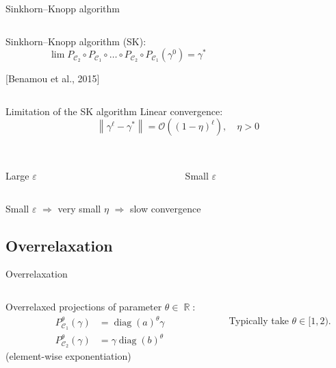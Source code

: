 \documentclass[compress]{beamer}
\DeclareMathOperator{\IR}{\mathbb{R}}
\DeclareMathOperator{\Ccal}{\mathcal{C}}
\DeclareMathOperator{\diag}{diag}
\newcommand{\norm}[1]{\left\lVert #1 \right\rVert}
\renewcommand{\epsilon}{\varepsilon}
\begin{document}
\begin{frame}{Sinkhorn--Knopp algorithm}
	
	\begin{columns}
	\begin{column}{0.6\textwidth}

	Sinkhorn--Knopp algorithm (SK):
	\[
	\lim P_{\Ccal_2}\circ P_{\Ccal_1} \circ \ldots \circ P_{\Ccal_2} \circ P_{\Ccal_1} (\gamma^0) = \gamma^*
	\]
	
	{\color{blue} [Benamou et al., 2015]}
	
\end{column}

\begin{column}{0.4\textwidth}
	\centering
	
\end{column}
\end{columns}
\end{frame}

\begin{frame}{Limitation of the SK algorithm}
Linear convergence:
\[ \norm{\gamma^\ell - \gamma^*} = \mathcal{O}\left((1-\eta)^\ell \right) , \quad \eta > 0 \]

\begin{columns}
	\begin{column}{0.5\textwidth}
		\centering
		\\
		Large $\epsilon$
	\end{column}
	\begin{column}{0.5\textwidth}
		\centering
		\\
		Small $\epsilon$
	\end{column}
\end{columns}

Small $\epsilon$ $\Longrightarrow$
very small $\eta$ $\Longrightarrow$
slow convergence
\end{frame}

\subsection{Overrelaxation}
\begin{frame}{Overrelaxation}
	\begin{columns}
		\begin{column}{0.6\textwidth}
			Overrelaxed projections of parameter $\theta \in \IR$:
			\begin{align*}\label{or_scaling}
			P_{\Ccal_1}^\theta(\gamma) &= \diag(a)^\theta \gamma\\
			P_{\Ccal_2}^\theta(\gamma) &= \gamma \diag(b)^\theta \nonumber
			\end{align*}
			(element-wise exponentiation)
		\end{column}
		\begin{column}{0.4\textwidth}
			\centering
			\\
			Typically take $\theta \in [1,2)$.
		\end{column}
	\end{columns}
\end{frame}
\end{document}
